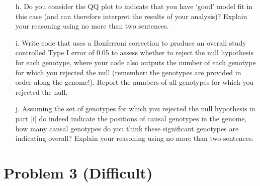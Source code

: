 \documentclass[letterpaper, 11pt]{article}
\begin{document}
\begin{itemize}
\item[h.] Do you consider the QQ plot to indicate that you have `good' model fit in this case (and can therefore interpret the results of your analysis)?  Explain your reasoning using no more than two sentences.

\item[i.] Write code that uses a Bonferroni correction to produce an overall study controlled Type I error of 0.05 to assess whether to reject the null hypothesis for each genotype, where your code also outputs the number of each genotype for which you rejected the null (remember: the genotypes are provided in order along the genome!).  Report the numbers of all genotypes for which you rejected the null.

\item[j.] Assuming the set of genotypes for which you rejected the null hypothesis in part [i] do indeed indicate the positions of causal genotypes in the genome, how many causal genotypes do you think these significant genotypes are indicating overall?  Explain your reasoning using no more than two sentences. 

\end{itemize}

\section*{Problem 3 (Difficult)}
\end{document}
